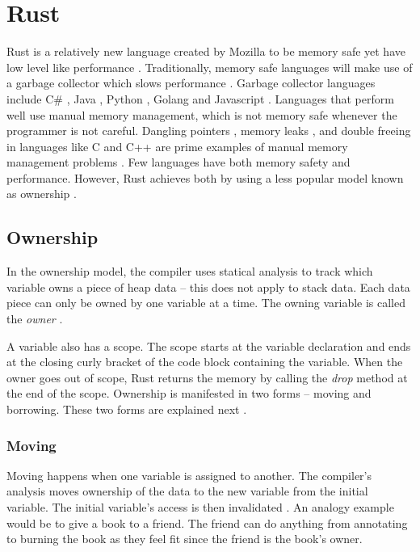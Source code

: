 \section{Rust}
\label{sec:Rust}
\newcommand{\errorh}[1]{\textcolor{Red!60!Maroon}{\footnotesize{- #1}}}

Rust is a relatively new language created by Mozilla to be memory safe yet have low level like performance \cite{klabnik_2019_01}.
Traditionally, memory safe languages will make use of a garbage collector which slows performance \cite{hertz_05_01}.
Garbage collector languages include C\# \cite{robinson_04_01}, Java \cite{gosling_96_01}, Python \cite{martelli_06_01}, Golang \cite{tsoukalos_18_01} and Javascript \cite{flanagan_06_01}.
Languages that perform well use manual memory management, which is not memory safe whenever the programmer is not careful.
Dangling pointers \cite{caballero_12_01}, memory leaks \cite{wilson_92_01}, and double freeing \cite{sharp_13_01} in languages like C and C++ are prime examples of manual memory management problems \cite{konrad_18_01}.
Few languages have both memory safety and performance.
However, Rust achieves both by using a less popular model known as ownership \cite{matsakis_14_01}.

\subsection{Ownership}
In the ownership model, the compiler uses statical analysis \cite{rasmussen_2019_01} to track which variable owns a piece of heap data -- this does not apply to stack data.
Each data piece can only be owned by one variable at a time.
The owning variable is called the \textit{owner} \cite{klabnik_2019_01}.

A variable also has a scope.
The scope starts at the variable declaration and ends at the closing curly bracket of the code block containing the variable.
When the owner goes out of scope, Rust returns the memory by calling the \textit{drop} method at the end of the scope.
Ownership is manifested in two forms -- moving and borrowing.
These two forms are explained next \cite{klabnik_2019_01}.

\subsubsection{Moving}
Moving happens when one variable is assigned to another.
The compiler's analysis moves ownership of the data to the new variable from the initial variable.
The initial variable's access is then invalidated \cite{klabnik_2019_01}.
An analogy example would be to give a book to a friend.
The friend can do anything from annotating to burning the book as they feel fit since the friend is the book's owner.

